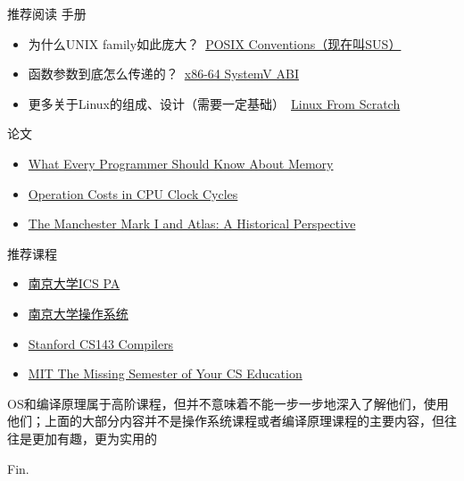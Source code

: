 \documentclass[aspectratio=1610]{beamer}
\begin{document}
\begin{frame}{推荐阅读}
    手册
    \begin{itemize}
        \item 为什么UNIX family如此庞大？\ \href{https://pubs.opengroup.org/onlinepubs/9799919799/index.html}{POSIX Conventions（现在叫SUS）}
        \item 函数参数到底怎么传递的？\ \href{https://gitlab.com/x86-psABIs/x86-64-ABI}{x86-64 SystemV ABI}
        \item 更多关于Linux的组成、设计（需要一定基础）\ \href{https://www.linuxfromscratch.org/}{Linux From Scratch}
    \end{itemize}

    论文
    \begin{itemize}
        \item \href{https://people.freebsd.org/~lstewart/articles/cpumemory.pdf}{What Every Programmer Should Know About Memory}
        \item \href{http://ithare.com/infographics-operation-costs-in-cpu-clock-cycles/}{Operation Costs in CPU Clock Cycles}
        \item \href{https://courses.cs.washington.edu/courses/cse550/20au/papers/CSE550.Atlas.pdf}{The Manchester Mark I and Atlas: A Historical Perspective}
    \end{itemize}

    推荐课程
    \begin{itemize}
        \item \href{https://nju-projectn.github.io/ics-pa-gitbook/}{南京大学ICS PA}
        \item \href{https://jyywiki.cn/OS/2024/}{南京大学操作系统}
        \item \href{https://web.stanford.edu/class/cs143/}{Stanford CS143 Compilers}
        \item \href{https://missing.csail.mit.edu/}{MIT The Missing Semester of Your CS Education}
    \end{itemize}

    OS和编译原理属于\alert{高阶课程}，但并不意味着不能一步一步地深入了解他们，使用他们；上面的大部分内容并不是操作系统课程或者编译原理课程的主要内容，但往往是更加有趣，更为实用的
\end{frame}

%     
%     

\begin{frame}
    \begin{center}
        {\Huge\calligra Fin.}
    \end{center}
\end{frame}
\end{document}
